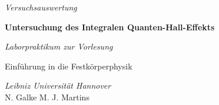 

\begin{center}

\Large
\textit{Versuchsauswertung}

\vspace{0.7cm}

\huge
\textbf{Untersuchung des Integralen Quanten-Hall-Effekts}

\vspace{1.1cm}

\Large
\textit{Laborpraktikum zur Vorlesung}

\vspace{0.2cm}

Einführung in die Festkörperphysik


\vspace{2cm}

\Large
\textit{Leibniz Universität Hannover}\\
\vspace{0.5cm}
N. Galke \hspace{1cm} M. J. Martins

\end{center}

\normalsize

\vspace{1.4cm}


\clearpage

\doublespacing
\tableofcontents

\clearpage

\setcounter{page}{1}

\singlespacing
